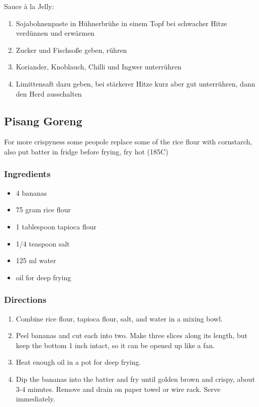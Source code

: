 Sauce à la Jelly:
\begin{enumerate}
\item Sojabohnenpaste in Hühnerbrühe in einem Topf bei schwacher Hitze verdünnen und erwärmen
\item Zucker und Fischsoße geben, rühren
\item Koriander, Knoblauch, Chilli und Ingwer unterrühren
\item Limittensaft dazu geben, bei stärkerer Hitze kurz aber gut unterrühren, dann den Herd ausschalten
\end{enumerate}
\pagebreak

\subsection{Pisang Goreng}
For more crispyness some peopole replace some of the rice flour with cornstarch, also put batter in fridge before frying, fry hot (185C)
\subsubsection*{Ingredients}
\begin{itemize}
\item[]     4 bananas
\item[]     75 gram rice flour
\item[]     1 tablespoon tapioca flour
\item[]     1/4 teaspoon salt
\item[]     125 ml water
\item[]     oil for deep frying
\end{itemize}
\subsubsection*{Directions}
\begin{enumerate}
\item     Combine rice flour, tapioca flour, salt, and water in a mixing bowl.
\item     Peel bananas and cut each into two. Make three slices along its length, but keep the bottom 1 inch intact, so it can be opened up like a fan.
\item     Heat enough oil in a pot for deep frying.
\item     Dip the bananas into the batter and fry until golden brown and crispy, about 3-4 minutes. Remove and drain on paper towel or wire rack. Serve immediately.

\end{enumerate}
\pagebreak

